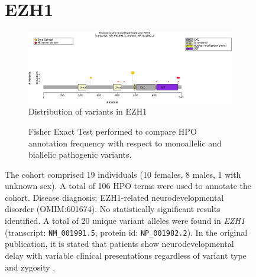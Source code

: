 \begin{figure}[htbp]
\section*{EZH1}
\centering
\begin{subfigure}[b]{0.95\textwidth}
\centering
\includegraphics[width=\textwidth]{ img/EZH1_protein_diagram.pdf} 
\captionsetup{justification=raggedright,singlelinecheck=false}
\caption{Distribution of variants in EZH1}
\end{subfigure}

\vspace{2em}

\begin{subfigure}[b]{0.95\textwidth}
\centering
{}
\captionsetup{justification=raggedright,singlelinecheck=false}
\caption{Fisher Exact Test performed to compare HPO annotation frequency with respect to monoallelic and biallelic pathogenic variants. }
\end{subfigure}

\vspace{2em}

\caption{The cohort comprised 19 individuals (10 females, 8 males, 1 with unknown sex). A total of 106 HPO terms were used to annotate the cohort. Disease diagnosis: EZH1-related neurodevelopmental disorder (OMIM:601674). No statistically significant results identified. A total of 20 unique variant alleles were found in \textit{EZH1} (transcript: \texttt{NM\_001991.5}, protein id: \texttt{NP\_001982.2}). In the original publication, it is stated that patients show neurodevelopmental delay with variable clinical presentations regardless of variant type and zygosity \cite{PMID_37433783}.}
\end{figure}
